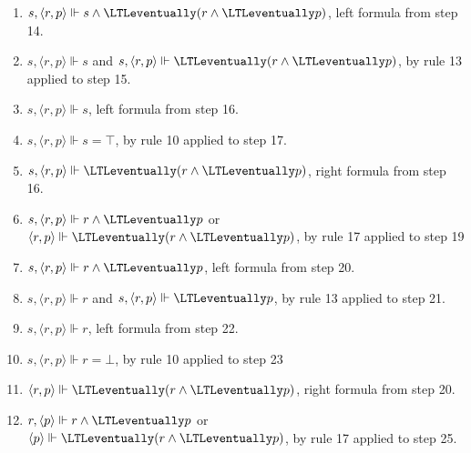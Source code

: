 \begin{myEx}
\begin{enumerate}
\item $s, \langle r,p \rangle \Vdash s \land \LTLeventually(r \land \LTLeventually p)$, left formula from step 14.\\ %

\item $s, \langle r,p \rangle \Vdash s$ and $s, \langle r,p \rangle \Vdash \LTLeventually(r \land \LTLeventually p)$, by rule 13 applied to step 15.\\ %

\item $s, \langle r,p \rangle \Vdash s$, left formula from step 16.\\ %

\item $s, \langle r,p \rangle \Vdash s = \top$, by rule 10 applied to step 17.\\ %

\item $s, \langle r,p \rangle \Vdash \LTLeventually(r \land \LTLeventually p)$, right formula from step 16.\\ %

\item $s, \langle r,p \rangle \Vdash r \land \LTLeventually p$ or $\langle r,p \rangle \Vdash \LTLeventually(r \land \LTLeventually p)$, by rule 17 applied to step 19\\ %

\item $s, \langle r,p \rangle \Vdash r \land \LTLeventually p$, left formula from step 20.\\ %

\item $s, \langle r,p \rangle \Vdash r$ and $s, \langle r,p \rangle \Vdash \LTLeventually p$, by rule 13 applied to step 21.\\ %

\item $s, \langle r,p \rangle \Vdash r$, left formula from step 22.\\ %

\item $s, \langle r,p \rangle \Vdash r = \bot$, by rule 10 applied to step 23\\ %

\item $\langle r,p \rangle \Vdash \LTLeventually(r \land \LTLeventually p)$, right formula from step 20.\\ %

\item $r, \langle p \rangle \Vdash r \land \LTLeventually p$ or $\langle p \rangle \Vdash \LTLeventually(r \land \LTLeventually p)$, by rule 17 applied to step 25.\\ %


\end{enumerate}
\end{myEx}
